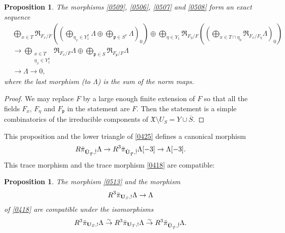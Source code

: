 \documentclass{amsart}
\newtheorem{Prop}[Thm]{Proposition}
\theoremstyle{remark}
\numberwithin{equation}{subsection}
\newcommand{\isomto}{\overset{\sim}{\to}}
\newcommand{\closure}[1]{\overline{#1}}
\newcommand{\alg}[1]{\mathbf{#1}}
\newcommand{\ideal}[1]{\mathfrak{#1}}
\newcommand{\Weil}{\mathfrak{R}}
\begin{document}
\begin{Prop} \label{0423}
	The morphisms \eqref{0509}, \eqref{0506}, \eqref{0507} and \eqref{0508} form an exact sequence
		\begin{align*}
			&
						\bigoplus_{x \in T}
							\Weil_{F_{x} / F} \left(
								\left(
										\bigoplus_{\eta_{x} \in Y_{1}^{x}} \Lambda
									\oplus
										\bigoplus_{\ideal{p} \in S^{x}} \Lambda
								\right)_{0}
						\right)
					\oplus
						\bigoplus_{\eta \in Y_{1}}
							\Weil_{F_{\eta} / F} \left(
								\left(
									\bigoplus_{x \in T \cap \eta_{0}}
										\Weil_{F_{x} / F_{\eta}} \Lambda
								\right)_{0}
						\right)
			\\
			&	\to
						\bigoplus_{
							\substack{
								x \in T \\
								\eta_{x} \in Y_{1}^{x}
							}
						}
							\Weil_{F_{x} / F} \Lambda
					\oplus
						\bigoplus_{\ideal{p} \in S}
							\Weil_{F_{\ideal{p}} / F} \Lambda
			\\
			&	\to
					\Lambda
				\to
					0,
		\end{align*}
	where the last morphism (to $\Lambda$) is the sum of the norm maps.
\end{Prop}

\begin{proof}
	We may replace $F$ by a large enough finite extension of $F$
	so that all the fields $F_{x}$, $F_{\eta}$ and $F_{\ideal{p}}$ in the statement are $F$.
	Then the statement is a simple combinatorics of the irreducible components of
	$\mathfrak{X} \setminus U_{S} = Y \cup \closure{S}$.
\end{proof}

This proposition and the lower triangle of \eqref{0425} defines a canonical morphism
	\begin{equation} \label{0513}
				R \Bar{\pi}_{\Hat{\alg{U}}_{\Hat{T}}, \Hat{!}} \Lambda
			\to
				R^{3} \Bar{\pi}_{\Hat{\alg{U}}_{\Hat{T}}, \Hat{!}} \Lambda[-3]
			\to
				\Lambda[-3].
	\end{equation}
This trace morphism and the trace morphism \eqref{0418} are compatible:

\begin{Prop}
	The morphism \eqref{0513} and the morphism
		\[
				R^{3} \Bar{\pi}_{\alg{U}_{S}, !} \Lambda
			\to
				\Lambda
		\]
	of \eqref{0418} are compatible under the isomorphisms
		\[
				R^{3} \Bar{\pi}_{\alg{U}_{S}, !} \Lambda
			\isomto
				R^{3} \Bar{\pi}_{\alg{U}_{T}, !} \Lambda
			\isomto
				R^{3} \Bar{\pi}_{\Hat{\alg{U}}_{\Hat{T}}, \Hat{!}} \Lambda.
		\]
\end{Prop}
\end{document}
